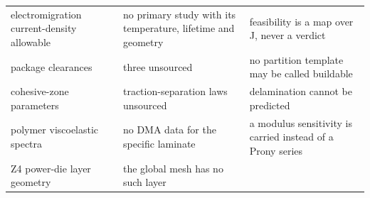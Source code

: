 \documentclass[10pt,]{article}
\begin{document}
\begin{longtable}[]{@{}lll@{}}
\begin{minipage}[t]{0.30\columnwidth}
electromigration current-density allowable\strut
\end{minipage} & \begin{minipage}[t]{0.30\columnwidth}\raggedright
no primary study with its temperature, lifetime and geometry\strut
\end{minipage} & \begin{minipage}[t]{0.30\columnwidth}\raggedright
feasibility is a map over J, never a verdict\strut
\end{minipage}\tabularnewline
\begin{minipage}[t]{0.30\columnwidth}\raggedright
package clearances\strut
\end{minipage} & \begin{minipage}[t]{0.30\columnwidth}\raggedright
three unsourced\strut
\end{minipage} & \begin{minipage}[t]{0.30\columnwidth}\raggedright
no partition template may be called buildable\strut
\end{minipage}\tabularnewline
\begin{minipage}[t]{0.30\columnwidth}\raggedright
cohesive-zone parameters\strut
\end{minipage} & \begin{minipage}[t]{0.30\columnwidth}\raggedright
traction-separation laws unsourced\strut
\end{minipage} & \begin{minipage}[t]{0.30\columnwidth}\raggedright
delamination cannot be predicted\strut
\end{minipage}\tabularnewline
\begin{minipage}[t]{0.30\columnwidth}\raggedright
polymer viscoelastic spectra\strut
\end{minipage} & \begin{minipage}[t]{0.30\columnwidth}\raggedright
no DMA data for the specific laminate\strut
\end{minipage} & \begin{minipage}[t]{0.30\columnwidth}\raggedright
a modulus sensitivity is carried instead of a Prony series\strut
\end{minipage}\tabularnewline
\begin{minipage}[t]{0.30\columnwidth}\raggedright
Z4 power-die layer geometry\strut
\end{minipage} & \begin{minipage}[t]{0.30\columnwidth}\raggedright
the global mesh has no such layer\strut
\end{minipage} & \begin{minipage}[t]{0.30\columnwidth}\raggedright

\end{minipage}
\end{longtable}
\end{document}
